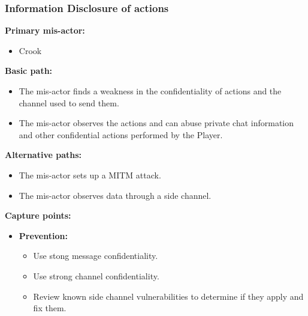\documentclass[a4paper,11pt]{report}
\begin{document}
\subsubsection{Information Disclosure of actions}
\label{PlayerFlowCasesI3}
\textbf{Primary mis-actor:}
\begin{itemize}
\item Crook
\end{itemize}
\textbf{Basic path:}
\begin{itemize}
\item The mis-actor finds a weakness in the confidentiality of actions and the channel used to send them.
\item The mis-actor observes the actions and can abuse private chat information and other confidential actions performed by the Player.
\end{itemize}
\textbf{Alternative paths:}
\begin{itemize}
\item The mis-actor sets up a MITM attack.
\item The mis-actor observes data through a side channel.
\end{itemize}
\textbf{Capture points:}
\begin{itemize}
\item \textbf{Prevention:}
\begin{itemize}
\item Use stong message confidentiality.
\item Use strong channel confidentiality.
\item Review known side channel vulnerabilities to determine if they apply and fix them.
\end{itemize}
\end{itemize}
\end{document}
